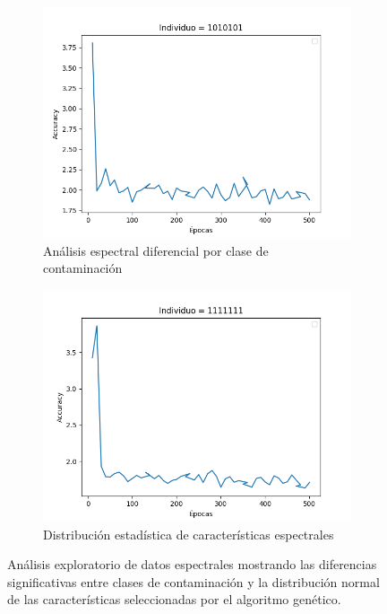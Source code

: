 \begin{figure}[!ht]
\centering
\begin{subfigure}[b]{0.45\textwidth}
    \includegraphics[width=\textwidth]{images/Figure_1.png}
    \caption{Análisis espectral diferencial por clase de contaminación}
    \label{fig:analisis_espectral}
\end{subfigure}
\hfill
\begin{subfigure}[b]{0.45\textwidth}
    \includegraphics[width=\textwidth]{images/Figure_2.png}
    \caption{Distribución estadística de características espectrales}
    \label{fig:distribucion_caracteristicas}
\end{subfigure}
\caption{Análisis exploratorio de datos espectrales mostrando las diferencias significativas entre clases de contaminación y la distribución normal de las características seleccionadas por el algoritmo genético.}
\label{fig:analisis_datos_espectrales}
\end{figure}

